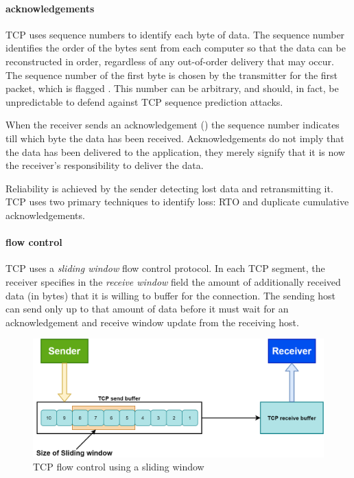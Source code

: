 \paragraph{acknowledgements}
\ac{TCP} uses sequence numbers to identify each byte of data.
The sequence number identifies the order of the bytes sent from each computer so that the data can be reconstructed in order, regardless of any out-of-order delivery that may occur.
The sequence number of the first byte is chosen by the transmitter for the first packet, which is flagged .
This number can be arbitrary, and should, in fact, be unpredictable to defend against \ac{TCP} sequence prediction attacks.

When the receiver sends an acknowledgement () the sequence number indicates till which byte the data has been received.
Acknowledgements do not imply that the data has been delivered to the application, they merely signify that it is now the receiver's responsibility to deliver the data.

Reliability is achieved by the sender detecting lost data and retransmitting it.
\ac{TCP} uses two primary techniques to identify loss: \acf{RTO} and duplicate cumulative acknowledgements.%


\paragraph{flow control}
\acs{TCP} uses a \emph{sliding window} flow control protocol.
In each \acs{TCP} segment, the receiver specifies in the \emph{receive window} field the amount of additionally received data (in bytes) that it is willing to buffer for the connection.
The sending host can send only up to that amount of data before it must wait for an acknowledgement and receive window update from the receiving host.


\begin{figure}
\centering
\includegraphics[width=.7\textwidth]{images/transport/flow-control.png}
\caption{\acs{TCP} flow control using a sliding window}
\label{fig:flow-control}
\end{figure}

